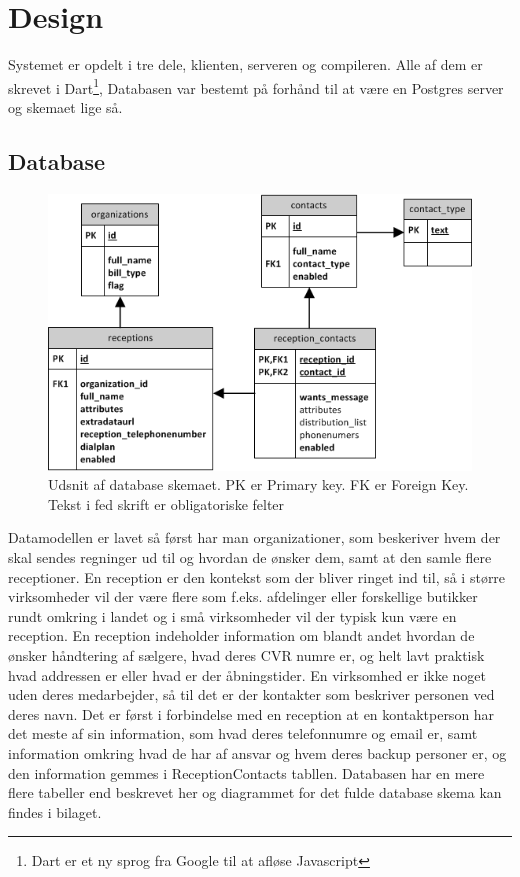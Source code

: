 \chapter{Design}
Systemet er opdelt i tre dele, klienten, serveren og compileren. Alle af dem er skrevet i Dart\footnote{Dart er et ny sprog fra Google til at afløse Javascript},
Databasen var bestemt på forhånd til at være en Postgres server og skemaet lige så.

\section{Database}
\begin{figure}[ht!]
\centering
\includegraphics[scale=0.7]{images/ER_Basic.png}
\caption{Udsnit af database skemaet. PK er Primary key. FK er Foreign Key. Tekst i fed skrift er obligatoriske felter}
\label{fig:erbasic}
\end{figure}
Datamodellen er lavet så først har man organizationer, som beskeriver hvem der skal sendes regninger ud til og hvordan de ønsker dem, samt at den samle flere receptioner. En reception er den kontekst som der bliver ringet ind til, så i større virksomheder vil der være flere som f.eks. afdelinger eller forskellige butikker rundt omkring i landet og i små virksomheder vil der typisk kun være en reception. En reception indeholder information om blandt andet hvordan de ønsker håndtering af sælgere, hvad deres CVR numre er, og helt lavt praktisk hvad addressen er eller hvad er der åbningstider. En virksomhed er ikke noget uden deres medarbejder, så til det er der kontakter som beskriver personen ved deres navn. Det er først i forbindelse med en reception at en kontaktperson har det meste af sin information, som hvad deres telefonnumre og email er, samt information omkring hvad de har af ansvar og hvem deres backup personer er, og den information gemmes i ReceptionContacts tabllen.
Databasen har en mere flere tabeller end beskrevet her og diagrammet for det fulde database skema kan findes i bilaget.

